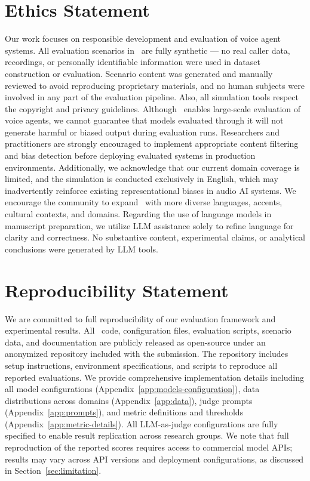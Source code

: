 \section*{Ethics Statement}
\label{sec:ethics}
Our work focuses on responsible development and evaluation of voice agent systems.
All evaluation scenarios in \framework~are fully synthetic — no real caller data, recordings, or personally identifiable information were used in dataset construction or evaluation. Scenario content was generated and manually reviewed to avoid reproducing proprietary materials, and no human subjects were involved in any part of the evaluation pipeline.
Also, all simulation tools respect the copyright and privacy guidelines. Although \framework~enables large-scale evaluation of voice agents, we cannot guarantee that models evaluated through it will not generate harmful or biased output during evaluation runs. Researchers and practitioners are strongly encouraged to implement appropriate content filtering and bias detection before deploying evaluated systems in production environments.
Additionally, we acknowledge that our current domain coverage is limited, and the simulation is conducted exclusively in English, which may inadvertently reinforce existing representational biases in audio AI systems. We encourage the community to expand \framework~with more diverse languages, accents, cultural contexts, and domains.
Regarding the use of language models in manuscript preparation, we utilize LLM assistance solely to refine language for clarity and correctness. No substantive content, experimental claims, or analytical conclusions were generated by LLM tools.




\section*{Reproducibility Statement}
\label{sec:reproducibility}

We are committed to full reproducibility of our evaluation framework and experimental results. All \framework~code, configuration files, evaluation scripts, scenario data, and documentation are publicly released as open-source under an anonymized repository included with the submission. The repository includes setup instructions, environment specifications, and scripts to reproduce all reported evaluations.
We provide comprehensive implementation details including all model configurations (Appendix~\ref{app:models-configuration}), data distributions across domains (Appendix~\ref{app:data}), judge prompts (Appendix~\ref{app:prompts}), and metric definitions and thresholds (Appendix~\ref{app:metric-details}). All LLM-as-judge configurations are fully specified to enable result replication across research groups. We note that full reproduction of the reported scores requires access to commercial model APIs; results may vary across API versions and deployment configurations, as discussed in Section~\ref{sec:limitation}.

